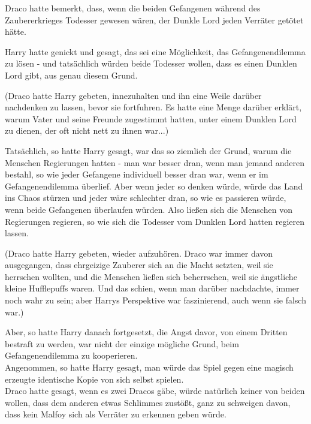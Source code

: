 {Draco hatte bemerkt, dass, wenn die beiden Gefangenen während des Zaubererkrieges Todesser gewesen wären, der Dunkle Lord jeden Verräter getötet hätte.

Harry hatte genickt und gesagt, das sei eine Möglichkeit, das Gefangenendilemma zu lösen - und tatsächlich würden beide Todesser wollen, dass es einen Dunklen Lord gibt, aus genau diesem Grund.

(Draco hatte Harry gebeten, innezuhalten und ihn eine Weile darüber nachdenken zu lassen, bevor sie fortfuhren. Es hatte eine Menge darüber erklärt, warum Vater und seine Freunde zugestimmt hatten, unter einem Dunklen Lord zu dienen, der oft nicht nett zu ihnen war...)

Tatsächlich, so hatte Harry gesagt, war das so ziemlich der Grund, warum die Menschen Regierungen hatten - man war besser dran, wenn man jemand anderen bestahl, so wie jeder Gefangene individuell besser dran war, wenn er im Gefangenendilemma überlief. Aber wenn jeder so denken würde, würde das Land ins Chaos stürzen und jeder wäre schlechter dran, so wie es passieren würde, wenn beide Gefangenen überlaufen würden. Also ließen sich die Menschen von Regierungen regieren, so wie sich die Todesser vom Dunklen Lord hatten regieren lassen.

(Draco hatte Harry gebeten, wieder aufzuhören. Draco war immer davon ausgegangen, dass ehrgeizige Zauberer sich an die Macht setzten, weil sie herrschen wollten, und die Menschen ließen sich beherrschen, weil sie ängstliche kleine Hufflepuffs waren. Und das schien, wenn man darüber nachdachte, immer noch wahr zu sein; aber Harrys Perspektive war faszinierend, auch wenn sie falsch war.)

Aber, so hatte Harry danach fortgesetzt, die Angst davor, von einem Dritten bestraft zu werden, war nicht der einzige mögliche Grund, beim Gefangenendilemma zu kooperieren.\\ Angenommen, so hatte Harry gesagt, man würde das Spiel gegen eine magisch erzeugte identische Kopie von sich selbst spielen.\\ Draco hatte gesagt, wenn es zwei Dracos gäbe, würde natürlich keiner von beiden wollen, dass dem anderen etwas Schlimmes zustößt, ganz zu schweigen davon, dass kein Malfoy sich als Verräter zu erkennen geben würde.

}

